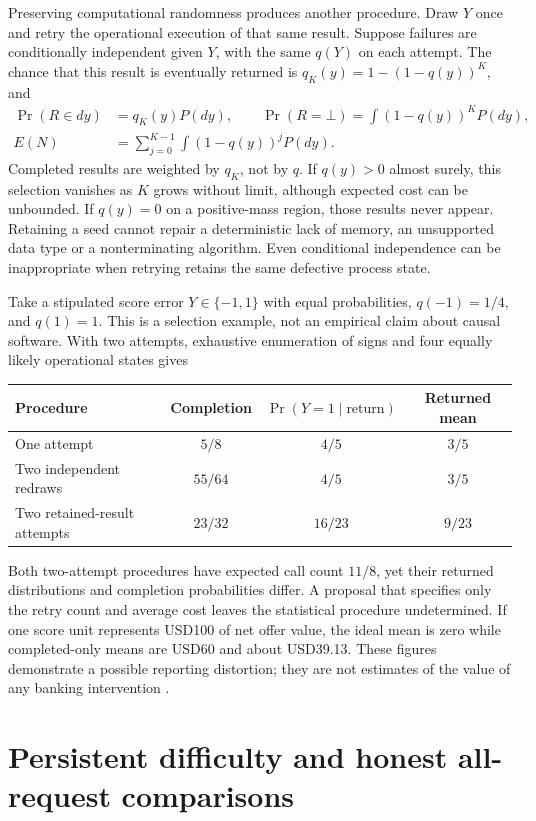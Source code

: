 Preserving computational randomness produces another procedure. Draw $Y$ once
and retry the operational execution of that same result. Suppose failures are
conditionally independent given $Y$, with the same $q(Y)$ on each attempt.
The chance that this result is eventually returned is
$q_K(y)=1-(1-q(y))^K$, and
\begin{align}
 \Pr(R\in dy)&=q_K(y)P(dy),\qquad
 \Pr(R=\bot)=\int(1-q(y))^K P(dy),
 \nonumber\\
 E(N)&=\sum_{j=0}^{K-1}\int(1-q(y))^jP(dy).
 \label{exec17:s9-frozen-law}
\end{align}
Completed results are weighted by $q_K$, not by $q$. If $q(y)>0$ almost
surely, this selection vanishes as $K$ grows without limit, although expected
cost can be unbounded. If $q(y)=0$ on a positive-mass region, those results
never appear. Retaining a seed cannot repair a deterministic lack of memory,
an unsupported data type or a nonterminating algorithm. Even conditional
independence can be inappropriate when retrying retains the same defective
process state.

Take a stipulated score error $Y\in\{-1,1\}$ with equal probabilities,
$q(-1)=1/4$, and $q(1)=1$. This is a selection example, not an empirical
claim about causal software. With two attempts, exhaustive enumeration of
signs and four equally likely operational states gives
\begin{center}
\begin{tabular}{lccc}
\hline
Procedure & Completion & $\Pr(Y=1\mid\text{return})$ & Returned mean\\
\hline
One attempt & $5/8$ & $4/5$ & $3/5$\\
Two independent redraws & $55/64$ & $4/5$ & $3/5$\\
Two retained-result attempts & $23/32$ & $16/23$ & $9/23$\\
\hline
\end{tabular}
\end{center}
Both two-attempt procedures have expected call count $11/8$, yet their
returned distributions and completion probabilities differ. A proposal that
specifies only the retry count and average cost leaves the statistical
procedure undetermined. If one score unit represents USD100 of net offer
value, the ideal mean is zero while completed-only means are USD60 and about
USD39.13. These figures demonstrate a possible reporting distortion; they are
not estimates of the value of any banking intervention
\citep{exec17_s9_composition}.

\section{Persistent difficulty and honest all-request comparisons}
\label{exec17:s9-persistent-failures}

